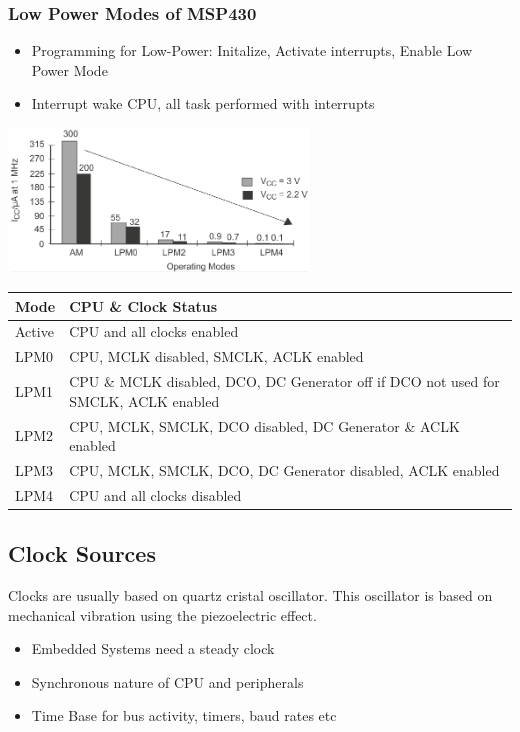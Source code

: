 \subsubsection{Low Power Modes of MSP430 }
\begin{minipage}{11cm}
	\begin{itemize}
		\item Programming for Low-Power: Initalize, Activate interrupts, Enable Low Power Mode
		\item Interrupt wake CPU, all task performed with interrupts
	\end{itemize}
\end{minipage}
		\begin{minipage}{8cm}
	\includegraphics[width=8cm]{images/lowpower.png}
\end{minipage}
\begin{tabular}{|l|l|}
	\hline
	\textbf{Mode} & \textbf{CPU \& Clock Status}\\
	\hline
	Active & CPU and all clocks enabled\\
	\hline
	LPM0 & CPU, MCLK disabled, SMCLK, ACLK enabled \\
	\hline
	LPM1 & CPU \& MCLK disabled, DCO, DC Generator off if DCO not used for SMCLK, ACLK enabled\\
	\hline
	LPM2 & CPU, MCLK, SMCLK, DCO disabled, DC Generator \& ACLK enabled\\
	\hline
	LPM3 & CPU, MCLK, SMCLK, DCO, DC Generator disabled, ACLK enabled\\
	\hline
	LPM4 & CPU and all clocks disabled\\
	\hline	
\end{tabular}


\subsection{Clock Sources }
Clocks are usually based on quartz cristal oscillator. This oscillator is based on mechanical vibration using the piezoelectric effect. 
\begin{itemize}
	\item Embedded Systems need a steady clock
	\item Synchronous nature of CPU and peripherals
	\item Time Base for bus activity, timers, baud rates etc
\end{itemize}
